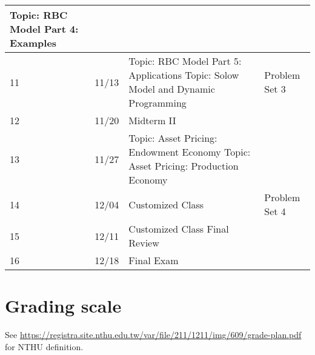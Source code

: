 \documentclass[12pt]{article}
\begin{document}
\begin{tabular}{|p{\bb}|p{\bb}|p{\pp}|p{\rr}|}
        \newline
        Topic: RBC Model Part 4: Examples
        &
    \\
    \hline
        11
        &
        11/13
        &
        Topic: RBC Model Part 5: Applications
        \newline
        Topic: Solow Model and Dynamic Programming
        &
        Problem Set 3
    \\
    \hline
        12
        &
        11/20
        &
        Midterm II
        &
    \\
    \hline
        13
        &
        11/27
        &
        Topic: Asset Pricing: Endowment Economy
        \newline
        Topic: Asset Pricing: Production Economy
        &
    \\
    \hline
        14
        &
        12/04
        &
        Customized Class
        &
        Problem Set 4
    \\
    \hline
        15
        &
        12/11
        &
        Customized Class
        \newline
        Final Review
        &
    \\
    \hline
        16
        &
        12/18
        &
        Final Exam
        &
    \\
    \hline
\end{tabular}

\section*{Grading scale}

See \url{https://registra.site.nthu.edu.tw/var/file/211/1211/img/609/grade-plan.pdf} for NTHU definition.
\end{document}
